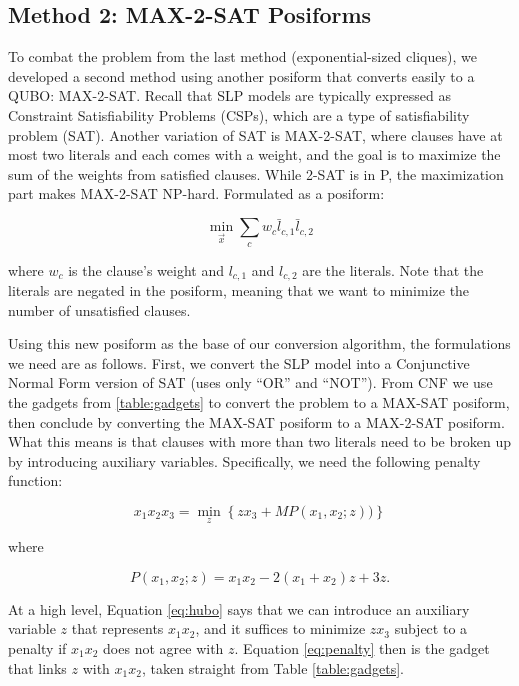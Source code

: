 \documentclass{sig-alternate-05-2015}
\begin{document}
\subsection{Method 2: MAX-2-SAT Posiforms}
To combat the problem from the last method (exponential-sized cliques), we developed a second method using another posiform that converts easily to a QUBO: MAX-2-SAT. Recall that SLP models are typically expressed as Constraint Satisfiability Problems (CSPs), which are a type of satisfiability problem (SAT). Another variation of SAT is MAX-2-SAT, where clauses have at most two literals and each comes with a weight, and the goal is to maximize the sum of the weights from satisfied clauses. While 2-SAT is in P, the maximization part makes MAX-2-SAT NP-hard. Formulated as a posiform:

\begin{equation}
\min_{\vec{x}} \sum_c w_c \bar{l}_{c,1} \bar{l}_{c,2}
\end{equation}

where $w_c$ is the clause's weight and $l_{c,1}$ and $l_{c,2}$ are the literals. Note that the literals are negated in the posiform, meaning that we want to minimize the number of unsatisfied clauses.

Using this new posiform as the base of our conversion algorithm, the formulations we need are as follows. First, we convert the SLP model into a Conjunctive Normal Form version of SAT (uses only ``OR'' and ``NOT''). From CNF we use the gadgets from \ref{table:gadgets} to convert the problem to a MAX-SAT posiform, then conclude by converting the MAX-SAT posiform to a MAX-2-SAT posiform. What this means is that clauses with more than two literals need to be broken up by introducing auxiliary variables. Specifically, we need the following penalty function:

\begin{equation}
\label{eq:hubo}
x_1x_2x_3 = \min_z \left\{ zx_3 + M P(x_1, x_2; z))\right\}
\end{equation}

where

\begin{equation}
\label{eq:penalty}
P(x_1, x_2; z) = x_1x_2 - 2(x_1 + x_2)z + 3z.
\end{equation}

At a high level, Equation \ref{eq:hubo} says that we can introduce an auxiliary variable $z$ that represents $x_1x_2$, and it suffices to minimize $zx_3$ subject to a penalty if $x_1x_2$ does not agree with $z$. Equation \ref{eq:penalty} then is the gadget that links $z$ with $x_1x_2$, taken straight from Table \ref{table:gadgets}.
\end{document}
